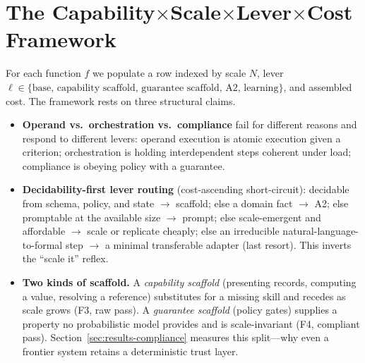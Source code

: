 \section{The Capability$\times$Scale$\times$Lever$\times$Cost Framework}\label{sec:framework}
For each function $f$ we populate a row indexed by scale $N$, lever $\ell \in \{\text{base, capability scaffold, guarantee scaffold, A2, learning}\}$, and assembled cost. The framework rests on three structural claims.
\begin{itemize}\itemsep1pt
\item \textbf{Operand vs.\ orchestration vs.\ compliance} fail for different reasons and respond to different levers: operand execution is atomic execution given a criterion; orchestration is holding interdependent steps coherent under load; compliance is obeying policy with a guarantee.
\item \textbf{Decidability-first lever routing} (cost-ascending short-circuit): decidable from schema, policy, and state $\to$ scaffold; else a domain fact $\to$ A2; else promptable at the available size $\to$ prompt; else scale-emergent and affordable $\to$ scale or replicate cheaply; else an irreducible natural-language-to-formal step $\to$ a minimal transferable adapter (last resort). This inverts the ``scale it'' reflex.
\item \textbf{Two kinds of scaffold.} A \emph{capability scaffold} (presenting records, computing a value, resolving a reference) substitutes for a missing skill and recedes as scale grows (F3, raw pass). A \emph{guarantee scaffold} (policy gates) supplies a property no probabilistic model provides and is scale-invariant (F4, compliant pass). Section~\ref{sec:results-compliance} measures this split---why even a frontier system retains a deterministic trust layer.
\end{itemize}
